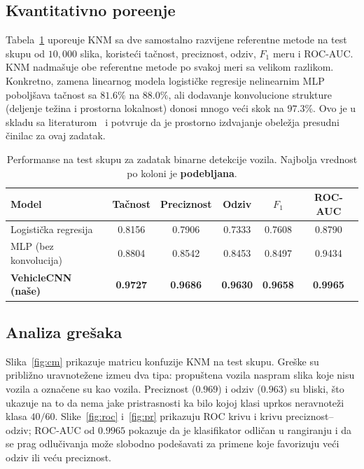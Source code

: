 \documentclass[11pt,a4paper]{article}
\begin{document}
\subsection{Kvantitativno pore\dj enje}
Tabela~\ref{tab:comparison} upore\dj uje KNM sa dve samostalno razvijene
referentne metode na test skupu od $10{,}000$ slika, koriste\'ci ta\v cnost,
preciznost, odziv, $F_1$ meru i ROC-AUC. KNM nadma\v suje obe referentne metode
po svakoj meri sa velikom razlikom. Konkretno, zamena linearnog modela
logisti\v cke regresije nelinearnim MLP pobolj\v sava ta\v cnost sa $81.6\%$ na
$88.0\%$, ali dodavanje konvolucione strukture (deljenje te\v zina i prostorna
lokalnost) donosi mnogo ve\'ci skok na $97.3\%$. Ovo je u skladu sa
literaturom~\cite{krizhevsky2012imagenet,simonyan2015very} i potvr\dj uje da je
prostorno izdvajanje obele\v zja presudni \v cinilac za ovaj zadatak.

\begin{table}[h]
\centering
\caption{Performanse na test skupu za zadatak binarne detekcije vozila.
Najbolja vrednost po koloni je \textbf{podebljana}.}
\label{tab:comparison}
\begin{tabular}{lccccc}
\toprule
\textbf{Model} & \textbf{Ta\v cnost} & \textbf{Preciznost} & \textbf{Odziv} & \textbf{$F_1$} & \textbf{ROC-AUC} \\
\midrule
Logisti\v cka regresija    & 0.8156 & 0.7906 & 0.7333 & 0.7608 & 0.8790 \\
MLP (bez konvolucija)     & 0.8804 & 0.8542 & 0.8453 & 0.8497 & 0.9434 \\
\textbf{VehicleCNN (na\v se)} & \textbf{0.9727} & \textbf{0.9686} & \textbf{0.9630} & \textbf{0.9658} & \textbf{0.9965} \\
\bottomrule
\end{tabular}
\end{table}

\subsection{Analiza gre\v saka}
Slika~\ref{fig:cm} prikazuje matricu konfuzije KNM na test skupu. Gre\v ske su
pribli\v zno uravnote\v zene izme\dj u dva tipa: propu\v stena vozila naspram
slika koje nisu vozila a ozna\v cene su kao vozila. Preciznost ($0.969$) i odziv
($0.963$) su bliski, \v sto ukazuje na to da nema jake pristrasnosti ka bilo
kojoj klasi uprkos neravnote\v zi klasa $40/60$. Slike~\ref{fig:roc}
i~\ref{fig:pr} prikazuju ROC krivu i krivu preciznost--odziv; ROC-AUC od
$0.9965$ pokazuje da je klasifikator odli\v can u rangiranju i da se prag
odlu\v civanja mo\v ze slobodno pode\v savati za primene koje favorizuju ve\'ci
odziv ili ve\'cu preciznost.
\end{document}
